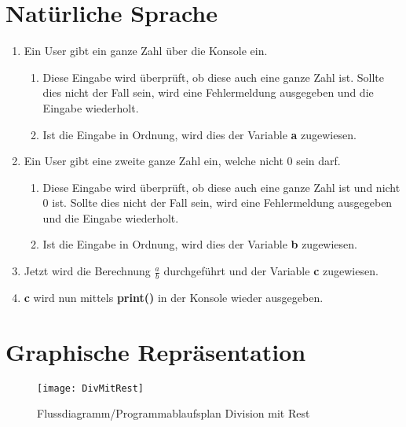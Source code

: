 \documentclass[12pt]{article}
\begin{document}
\section{Natürliche Sprache}
\begin{enumerate}
 \item Ein User gibt ein ganze Zahl über die Konsole ein.
 \begin{enumerate}
      \item Diese Eingabe wird überprüft, ob diese auch eine ganze Zahl ist. Sollte dies nicht der Fall sein, wird eine Fehlermeldung ausgegeben und die Eingabe wiederholt.
      \item Ist die Eingabe in Ordnung, wird dies der Variable \textbf{a} zugewiesen.
 \end{enumerate}
 \item Ein User gibt eine zweite ganze Zahl ein, welche nicht 0 sein darf.
 \begin{enumerate}
 \item Diese Eingabe wird überprüft, ob diese auch eine ganze Zahl ist und nicht 0 ist. Sollte dies nicht der Fall sein, wird eine Fehlermeldung ausgegeben und die Eingabe wiederholt.
 \item Ist die Eingabe in Ordnung, wird dies der Variable \textbf{b} zugewiesen.
\end{enumerate}
 \item Jetzt wird die Berechnung $\frac{a}{b}$ durchgeführt und der Variable \textbf{c} zugewiesen.
 \item \textbf{c} wird nun mittels \textbf{print()} in der Konsole wieder ausgegeben.
\end{enumerate}
\pagebreak
\section{Graphische Repräsentation}
\begin{figure}[h]
 \begin{center}
  \texttt{[image: DivMitRest]}
 \end{center}
 \caption{Flussdiagramm/Programmablaufsplan Division mit Rest}
\end{figure}
\pagebreak
\end{document}
